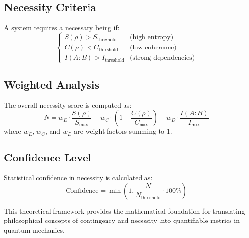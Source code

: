 \subsection{Necessity Criteria}
A system requires a necessary being if:
\begin{equation}
    \begin{cases}
        S(\rho) > S_{\text{threshold}} & \text{(high entropy)} \\
        C(\rho) < C_{\text{threshold}} & \text{(low coherence)} \\
        I(A:B) > I_{\text{threshold}} & \text{(strong dependencies)}
    \end{cases}
\end{equation}

\subsection{Weighted Analysis}
The overall necessity score is computed as:
\begin{equation}
    N = w_E\cdot\frac{S(\rho)}{S_{\text{max}}} + w_C\cdot(1-\frac{C(\rho)}{C_{\text{max}}}) + w_D\cdot\frac{I(A:B)}{I_{\text{max}}}
\end{equation}
where $w_E$, $w_C$, and $w_D$ are weight factors summing to 1.

\subsection{Confidence Level}
Statistical confidence in necessity is calculated as:
\begin{equation}
    \text{Confidence} = \min(1, \frac{N}{N_{\text{threshold}}} \cdot 100\%)
\end{equation}

This theoretical framework provides the mathematical foundation for translating philosophical concepts of contingency and necessity into quantifiable metrics in quantum mechanics.
